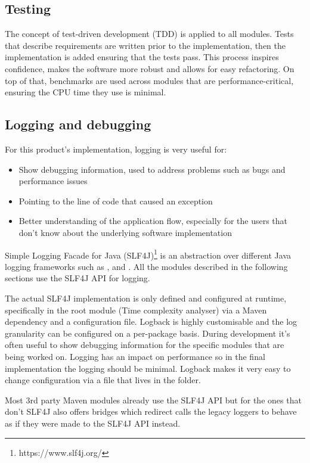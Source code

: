 \subsection{Testing}
The concept of test-driven development (TDD) is applied to all modules. Tests that describe requirements are written prior to the implementation, then the implementation is added ensuring that the tests pass. This process inspires confidence, makes the software more robust and allows for easy refactoring. On top of that, benchmarks are used across modules that are performance-critical, ensuring the CPU time they use is minimal.

\subsection{Logging and debugging}
For this product's implementation, logging is very useful for:
\begin{itemize}
  \item Show debugging information, used to address problems such as bugs and performance issues
  \item Pointing to the line of code that caused an exception
  \item Better understanding of the application flow, especially for the users that don't know about the underlying software implementation
\end{itemize}

\noindent Simple Logging Facade for Java (SLF4J)\footnote{https://www.slf4j.org/} is an abstraction over different Java logging frameworks such as ,  and . All the modules described in the following sections use the SLF4J API for logging.

\noindent The actual SLF4J implementation is only defined and configured at runtime, specifically in the root module (Time complexity analyser) via a Maven dependency and a configuration file. Logback is highly customisable and the log granularity can be configured on a per-package basis. During development it's often useful to show debugging information for the specific modules that are being worked on. Logging has an impact on performance so in the final implementation the logging should be minimal. Logback makes it very easy to change configuration via a  file that lives in the  folder.

\noindent Most 3rd party Maven modules already use the SLF4J API but for the ones that don't SLF4J also offers bridges which redirect calls the legacy loggers to behave as if they were made to the SLF4J API instead.

